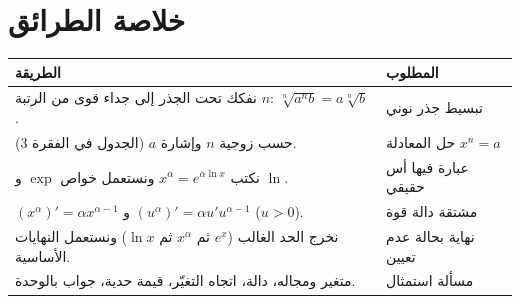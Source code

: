 \documentclass[12pt,a4paper]{article}
\begin{document}
\section{خلاصة الطرائق}
\begin{center}
\begin{tabular}{|p{}|p{}|}\hline
\rowcolor{cSec!12}\textbf{الطريقة} & \textbf{المطلوب}\\\hline
نفكك تحت الجذر إلى جداء قوى من الرتبة $n$: $\sqrt[n]{a^{n}b}=a\sqrt[n]{b}$. & تبسيط جذر نوني\\\hline
حسب زوجية $n$ وإشارة $a$ (الجدول في الفقرة 3). & حل المعادلة $x^{n}=a$\\\hline
نكتب $x^{\alpha}=e^{\alpha\ln x}$ ونستعمل خواص $\exp$ و $\ln$. & عبارة فيها أس حقيقي\\\hline
$\left(x^{\alpha}\right)'=\alpha x^{\alpha-1}$ و $\left(u^{\alpha}\right)'=\alpha u'u^{\alpha-1}$ ($u>0$). & مشتقة دالة قوة\\\hline
نخرج الحد الغالب ($e^{x}$ ثم $x^{\alpha}$ ثم $\ln x$) ونستعمل النهايات الأساسية. & نهاية بحالة عدم تعيين\\\hline
متغير ومجاله، دالة، اتجاه التغيّر، قيمة حدية، جواب بالوحدة. & مسألة استمثال\\\hline
\end{tabular}
\end{center}
\end{document}
